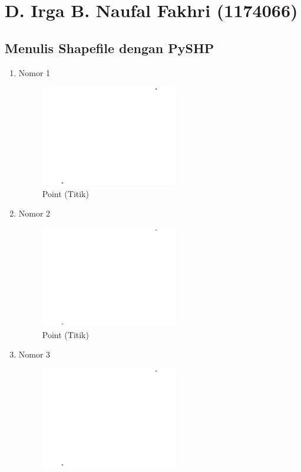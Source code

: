 \section{D. Irga B. Naufal Fakhri (1174066)}
\subsection{Menulis Shapefile dengan PySHP}
\begin{enumerate}
	\item Nomor 1
	
	\begin{figure}[H]
		\includegraphics[width=6cm]{figures/Tugas2/1174066/No1.jpeg}
		\centering
		\caption{Point (Titik)}
	\end{figure}
	\item Nomor 2
	
	\begin{figure}[H]
		\includegraphics[width=6cm]{figures/Tugas2/1174066/No2.jpeg}
		\centering
		\caption{Point (Titik)}
	\end{figure}
	\item Nomor 3
	
	\begin{figure}[H]
		\includegraphics[width=6cm]{figures/Tugas2/1174066/No3.jpeg}

\end{figure}
\end{enumerate}
